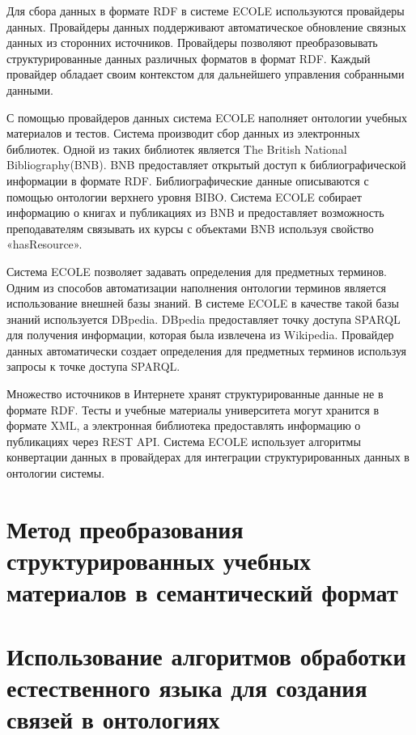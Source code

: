 Для сбора данных в формате RDF в системе ECOLE используются провайдеры данных. Провайдеры данных поддерживают автоматическое обновление связных данных из сторонних источников. Провайдеры позволяют преобразовывать структурированные данных различных форматов в формат RDF. Каждый провайдер обладает своим контекстом для дальнейшего управления собранными данными. 

С помощью провайдеров данных система ECOLE наполняет онтологии учебных материалов и тестов. Система производит сбор данных из электронных библиотек. Одной из таких библиотек является The British National Bibliography(BNB). BNB предоставляет открытый доступ к библиографической информации в формате RDF. Библиографические данные описываются с помощью онтологии верхнего уровня BIBO. Система ECOLE собирает информацию о книгах и публикациях из BNB и предоставляет возможность преподавателям связывать их курсы с объектами BNB используя свойство «hasResource».

Система ECOLE позволяет задавать определения для предметных терминов. Одним из способов автоматизации наполнения онтологии терминов является использование внешней базы знаний. В системе ECOLE в качестве такой базы знаний используется DBpedia. DBpedia предоставляет точку доступа SPARQL для получения информации, которая была извлечена из Wikipedia. Провайдер данных автоматически создает определения для предметных терминов используя запросы к точке доступа SPARQL.

Множество источников в Интернете хранят структурированные данные не в формате RDF. Тесты и учебные материалы университета могут хранится в формате XML, а электронная библиотека предоставлять информацию о публикациях через REST API. Система ECOLE использует алгоритмы конвертации данных в провайдерах для интеграции структурированных данных в онтологии системы.




\section{Метод преобразования структурированных учебных материалов в семантический формат} \label{sect3_7}




\section{Использование алгоритмов обработки естественного языка для создания связей в онтологиях} \label{sect3_8}

